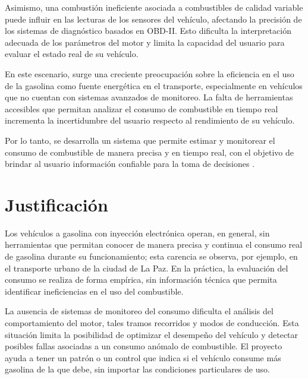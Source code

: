 Asimismo, una combustión ineficiente asociada a combustibles de calidad variable puede influir en las lecturas de los sensores del vehículo, afectando la precisión de los sistemas de diagnóstico basados en OBD-II. Esto dificulta la interpretación adecuada de los parámetros del motor y limita la capacidad del usuario para evaluar el estado real de su vehículo.

En este escenario, surge una creciente preocupación sobre la eficiencia en el uso de la gasolina como fuente energética en el transporte, especialmente en vehículos que no cuentan con sistemas avanzados de monitoreo. La falta de herramientas accesibles que permitan analizar el consumo de combustible en tiempo real incrementa la incertidumbre del usuario respecto al rendimiento de su vehículo.

Por lo tanto, se desarrolla un sistema que permite estimar y monitorear el consumo de combustible de manera precisa y en tiempo real, con el objetivo de brindar al usuario información confiable para la toma de decisiones \citep{lamby2026giro}.



\section{Justificación}

Los vehículos a gasolina con inyección electrónica operan, en general, sin herramientas que permitan conocer de manera precisa y continua el consumo real de gasolina durante su funcionamiento; esta carencia se observa, por ejemplo, en el transporte urbano de la ciudad de La Paz. En la práctica, la evaluación del consumo se realiza de forma empírica, sin información técnica que permita identificar ineficiencias en el uso del combustible.

La ausencia de sistemas de monitoreo del consumo dificulta el análisis del comportamiento del motor, tales tramos recorridos y modos de conducción. Esta situación limita la posibilidad de optimizar el desempeño del vehículo y detectar posibles fallas asociadas a un consumo anómalo de combustible. El proyecto ayuda a tener un patrón o un control que indica si el vehículo consume más gasolina de la que debe, sin importar las condiciones particulares de uso.

